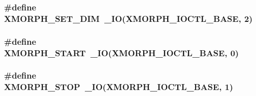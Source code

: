 \subsubsection[{\texorpdfstring{X\+M\+O\+R\+P\+H\+\_\+\+S\+E\+T\+\_\+\+D\+IM}{XMORPH_SET_DIM}}]{\setlength{\rightskip}{0pt plus 5cm}\#define X\+M\+O\+R\+P\+H\+\_\+\+S\+E\+T\+\_\+\+D\+IM~\+\_\+\+IO({\bf X\+M\+O\+R\+P\+H\+\_\+\+I\+O\+C\+T\+L\+\_\+\+B\+A\+SE}, 2)}\hypertarget{mf-hw-ip_8cpp_ad188c24482b068bac7d3dc2bb106bbfb}{}\label{mf-hw-ip_8cpp_ad188c24482b068bac7d3dc2bb106bbfb}
\subsubsection[{\texorpdfstring{X\+M\+O\+R\+P\+H\+\_\+\+S\+T\+A\+RT}{XMORPH_START}}]{\setlength{\rightskip}{0pt plus 5cm}\#define X\+M\+O\+R\+P\+H\+\_\+\+S\+T\+A\+RT~\+\_\+\+IO({\bf X\+M\+O\+R\+P\+H\+\_\+\+I\+O\+C\+T\+L\+\_\+\+B\+A\+SE}, 0)}\hypertarget{mf-hw-ip_8cpp_a9a30fd1ea7ebb580f4ffef098336f73f}{}\label{mf-hw-ip_8cpp_a9a30fd1ea7ebb580f4ffef098336f73f}
\subsubsection[{\texorpdfstring{X\+M\+O\+R\+P\+H\+\_\+\+S\+T\+OP}{XMORPH_STOP}}]{\setlength{\rightskip}{0pt plus 5cm}\#define X\+M\+O\+R\+P\+H\+\_\+\+S\+T\+OP~\+\_\+\+IO({\bf X\+M\+O\+R\+P\+H\+\_\+\+I\+O\+C\+T\+L\+\_\+\+B\+A\+SE}, 1)}\hypertarget{mf-hw-ip_8cpp_a1048583f6fc600a2b3b2c86b4b569a98}{}\label{mf-hw-ip_8cpp_a1048583f6fc600a2b3b2c86b4b569a98}
